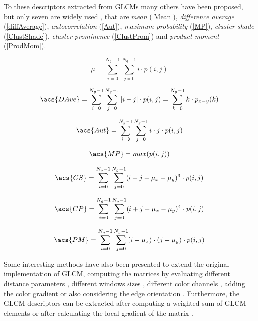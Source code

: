 \documentclass[final,a4paper,12pt,english]{UnicaPhdThesis3}
\begin{document}
To these descriptors extracted from GLCMs many others have been proposed, but only seven are widely used \cite{Soh, Clausi}, that are \textit{mean} (\ref {Mean}), \textit{difference average} (\ref{diffAverage}), \textit{autocorrelation} (\ref{Aut}), \textit{maximum probability} (\ref{MP}), \textit{cluster shade} (\ref{ClustShade}),  \textit{cluster prominence} (\ref {ClustProm}) and \textit{product moment} (\ref {ProdMom}). 

\begin{equation}\label{Mean}
{\mu}=\sum_{i=0}^{N_{g}-1}\sum_{j=0}^{N_{g}-1} i \cdot p(i,j)
\end{equation}

\begin{equation}\label{diffAverage}
\acs{DAve}= \sum_{i=0}^{N_{g}-1}\sum_{j=0}^{N_{g}-1}  |i-j| \cdot p(i,j) = \sum_{k=0}^{N_{g}-1} k \cdot p_{x-y}(k)
\end{equation}

\begin{equation}\label{Aut}
\acs{Aut}=\sum_{i=0}^{N_{g}-1}\sum_{j=0}^{N_{g}-1} i \cdot j \cdot p(i,j)
\end{equation}

\begin{equation}\label{MP}
\acs{MP}=max(p(i,j))
\end{equation}

\begin{equation}\label{ClustShade}
\acs{CS}=\sum_{i=0}^{N_{g}-1}\sum_{j=0}^{N_{g}-1}  (i + j - \mu_x - \mu_y)^3 \cdot p(i,j)
\end{equation}

\begin{equation}\label{ClustProm}
\acs{CP}=\sum_{i=0}^{N_{g}-1}\sum_{j=0}^{N_{g}-1}  (i + j - \mu_x - \mu_y)^4 \cdot p(i,j)
\end{equation}

\begin{equation}\label{ProdMom}
\acs{PM}=\sum_{i=0}^{N_{g}-1}\sum_{j=0}^{N_{g}-1}  (i - \mu_x) \cdot (j - \mu_y) \cdot p(i,j)
\end{equation}

Some interesting methods have also been presented to extend the original implementation of GLCM, computing the matrices by evaluating different distance parameters \cite{Gelz}, different windows sizes \cite{HuY}, different color channels \cite{Benco}, adding the color gradient \cite{Gong} or also considering the edge orientation \cite{Mitrea}. Furthermore, the GLCM descriptors can be extracted after computing a weighted sum of GLCM elements \cite{Walker} or after calculating the local gradient of the matrix \cite{Chen}. 
\end{document}

